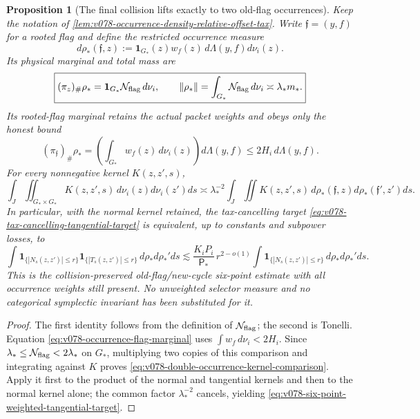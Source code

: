 \documentclass[10pt]{article}
\newtheorem{proposition}[theorem]{Proposition}
\begin{document}
\begin{proposition}[The final collision lifts exactly to two old-flag occurrences]
\label{prop:v078-double-occurrence-collision-lift}
Keep the notation of \cref{lem:v078-occurrence-density-relative-offset-tax}.  Write
\(\mathfrak f=(y,f)\) for a rooted flag and define the restricted occurrence measure
\begin{equation}
\label{eq:v078-restricted-flag-occurrence-measure}
d\rho_*(\mathfrak f,z)
:=
\mathbf 1_{G_*}(z)w_f(z)\,d\Lambda(y,f)d\nu_i(z).
\end{equation}
Its physical marginal and total mass are
\begin{equation}
\label{eq:v078-occurrence-physical-marginal}
\boxed{
(\pi_z)_\#\rho_*
=
\mathbf 1_{G_*}\mathcal N_{\rm flag}\,d\nu_i,
\qquad
\|\rho_*\|
=
\int_{G_*}\mathcal N_{\rm flag}\,d\nu_i
\asymp
\lambda_*m_*.
}
\end{equation}
Its rooted-flag marginal retains the actual packet weights and obeys only the honest bound
\begin{equation}
\label{eq:v078-occurrence-flag-marginal}
(\pi_{\mathfrak f})_\#\rho_*
=
\left(\int_{G_*}w_f(z)\,d\nu_i(z)\right)d\Lambda(y,f)
\le
2H_i\,d\Lambda(y,f).
\end{equation}
For every nonnegative kernel \(K(z,z',s)\),
\begin{equation}
\label{eq:v078-double-occurrence-kernel-comparison}
\boxed{
\int_J\iint_{G_*\times G_*}K(z,z',s)\,d\nu_i(z)d\nu_i(z')ds
\asymp
\lambda_*^{-2}
\int_J\iint K(z,z',s)\,d\rho_*(\mathfrak f,z)d\rho_*(\mathfrak f',z')ds.
}
\end{equation}
In particular, with the normal kernel retained, the tax-cancelling target
\eqref{eq:v078-tax-cancelling-tangential-target} is equivalent, up to constants and subpower
losses, to
\begin{equation}
\label{eq:v078-six-point-weighted-tangential-target}
\boxed{
\int
\mathbf 1_{\{|N_s(z,z')|\le r\}}
\mathbf 1_{\{|T_s(z,z')|\le r\}}
\,d\rho_*d\rho_*'ds
\lesssim
\frac{K_iP_i}{\mathsf P_*}\,r^{2-o(1)}
\int
\mathbf 1_{\{|N_s(z,z')|\le r\}}
\,d\rho_*d\rho_*'ds.
}
\end{equation}
This is the collision-preserved old-flag/new-cycle six-point estimate with all occurrence weights
still present.  No unweighted selector measure and no categorical symplectic invariant has been
substituted for it.
\end{proposition}

\begin{proof}
The first identity follows from the definition of
\(\mathcal N_{\rm flag}\); the second is Tonelli.  Equation
\eqref{eq:v078-occurrence-flag-marginal} uses
\(\int w_f\,d\nu_i<2H_i\).  Since
\(\lambda_*\le\mathcal N_{\rm flag}<2\lambda_*\) on \(G_*\), multiplying two copies of this
comparison and integrating against \(K\) proves
\eqref{eq:v078-double-occurrence-kernel-comparison}.  Apply it first to the product of the normal
and tangential kernels and then to the normal kernel alone; the common factor
\(\lambda_*^{-2}\) cancels, yielding
\eqref{eq:v078-six-point-weighted-tangential-target}.
\end{proof}
\end{document}

